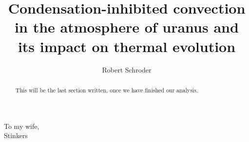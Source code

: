 \documentclass[11pt]{ucscthesisbs}
\begin{document}

\title{Condensation-inhibited convection in the atmosphere of uranus and its impact on thermal evolution}
\author{Robert Schroder}
%
%





\maketitle
\copyrightpage

\begin{frontmatter}

\begin{abstract}
This will be the last section written, once we have finished our analysis.
\end{abstract}

\tableofcontents
%
%
\listoffigures
\listoftables

\begin{dedication}
\null\vfil
{\large
\begin{center}
To my wife,\\\vspace{12pt}
Stinkers
\end{center}}
\vfil\null
\end{dedication}

\begin{acknowledgements}

\end{acknowledgements}


\end{frontmatter}

\end{document}
